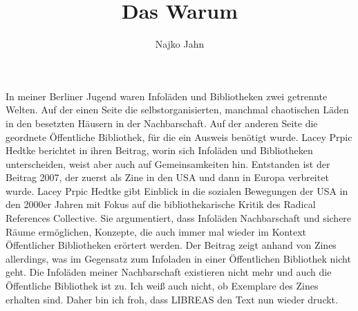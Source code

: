 \documentclass[output=paper]{langsci/langscibook}
\title{Das Warum}
\author{Najko Jahn  \affiliation{SUB Göttingen}}
\begin{document}
\maketitle

\noindent  In meiner Berliner Jugend waren Infoläden und Bibliotheken zwei getrennte Welten. Auf der einen Seite die selbstorganisierten, manchmal chaotischen Läden in den besetzten Häusern in der Nachbarschaft. Auf der anderen Seite die geordnete Öffentliche Bibliothek, für die ein Ausweis benötigt wurde. Lacey Prpic Hedtke berichtet in ihren Beitrag, worin sich Infoläden und Bibliotheken unterscheiden, weist aber auch auf Gemeinsamkeiten hin. Entstanden ist der Beitrag 2007, der zuerst als Zine in den USA und dann in Europa verbreitet wurde. Lacey Prpic Hedtke gibt Einblick in die sozialen Bewegungen der USA in den 2000er Jahren mit Fokus auf die bibliothekarische Kritik des Radical References Collective. Sie argumentiert, dass Infoläden  Nachbarschaft und sichere Räume ermöglichen, Konzepte, die auch immer mal wieder im Kontext Öffentlicher Bibliotheken erörtert werden. Der Beitrag zeigt anhand von Zines allerdings, was im Gegensatz zum Infoladen in einer Öffentlichen Bibliothek nicht geht. Die Infoläden meiner Nachbarschaft existieren nicht mehr und auch die Öffentliche Bibliothek ist zu. Ich weiß auch nicht, ob Exemplare des Zines erhalten sind. Daher bin ich froh, dass LIBREAS den Text nun wieder druckt.
\end{document}
